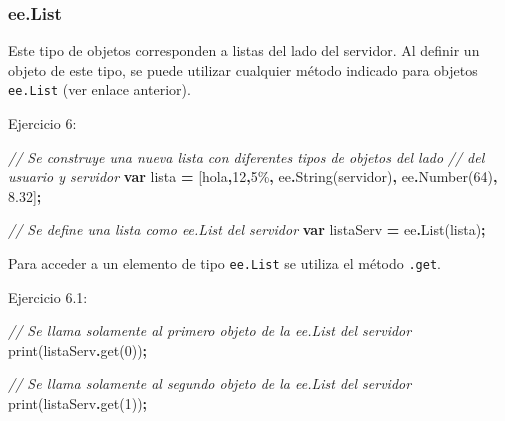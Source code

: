 \documentclass[
  12pt,
  letterpaper,
  twoside]{book}
\newenvironment{Shaded}{\begin{snugshade}}{\end{snugshade}}
\newcommand{\CommentTok}[1]{\textcolor[rgb]{0.56,0.35,0.01}{\textit{#1}}}
\newcommand{\DecValTok}[1]{\textcolor[rgb]{0.00,0.00,0.81}{#1}}
\newcommand{\FloatTok}[1]{\textcolor[rgb]{0.00,0.00,0.81}{#1}}
\newcommand{\FunctionTok}[1]{\textcolor[rgb]{0.00,0.00,0.00}{#1}}
\newcommand{\KeywordTok}[1]{\textcolor[rgb]{0.13,0.29,0.53}{\textbf{#1}}}
\newcommand{\NormalTok}[1]{#1}
\newcommand{\OperatorTok}[1]{\textcolor[rgb]{0.81,0.36,0.00}{\textbf{#1}}}
\newcommand{\StringTok}[1]{\textcolor[rgb]{0.31,0.60,0.02}{#1}}
\begin{document}
\hypertarget{ee.list}{%
\subsubsection*{ee.List}\label{ee.list}}

Este tipo de objetos corresponden a listas del lado del servidor. Al definir un objeto de este tipo, se puede utilizar cualquier método indicado para objetos \texttt{ee.List} (ver enlace anterior).

Ejercicio 6:

\begin{Shaded}
\begin{Highlighting}[]
\CommentTok{// Se construye una nueva lista con diferentes tipos de objetos del lado }
\CommentTok{// del usuario y servidor}
\KeywordTok{var}\NormalTok{ lista }\OperatorTok{=}\NormalTok{ [}\StringTok{\textquotesingle{}hola\textquotesingle{}}\OperatorTok{,}\StringTok{\textquotesingle{}12\textquotesingle{}}\OperatorTok{,}\StringTok{\textquotesingle{}5\%\textquotesingle{}}\OperatorTok{,}\NormalTok{ ee}\OperatorTok{.}\FunctionTok{String}\NormalTok{(}\StringTok{\textquotesingle{}servidor\textquotesingle{}}\NormalTok{)}\OperatorTok{,}\NormalTok{ ee}\OperatorTok{.}\FunctionTok{Number}\NormalTok{(}\DecValTok{64}\NormalTok{)}\OperatorTok{,} \FloatTok{8.32}\NormalTok{]}\OperatorTok{;}

\CommentTok{// Se define una lista como ee.List del servidor }
\KeywordTok{var}\NormalTok{ listaServ }\OperatorTok{=}\NormalTok{ ee}\OperatorTok{.}\FunctionTok{List}\NormalTok{(lista)}\OperatorTok{;}             
\end{Highlighting}
\end{Shaded}

Para acceder a un elemento de tipo \texttt{ee.List} se utiliza el método \texttt{.get}.

Ejercicio 6.1:

\begin{Shaded}
\begin{Highlighting}[]
\CommentTok{// Se llama solamente al primero objeto de la ee.List del servidor}
\FunctionTok{print}\NormalTok{(listaServ}\OperatorTok{.}\FunctionTok{get}\NormalTok{(}\DecValTok{0}\NormalTok{))}\OperatorTok{;}   

\CommentTok{// Se llama solamente al segundo objeto de la ee.List del servidor}
\FunctionTok{print}\NormalTok{(listaServ}\OperatorTok{.}\FunctionTok{get}\NormalTok{(}\DecValTok{1}\NormalTok{))}\OperatorTok{;} 
\end{Highlighting}
\end{Shaded}
\end{document}
